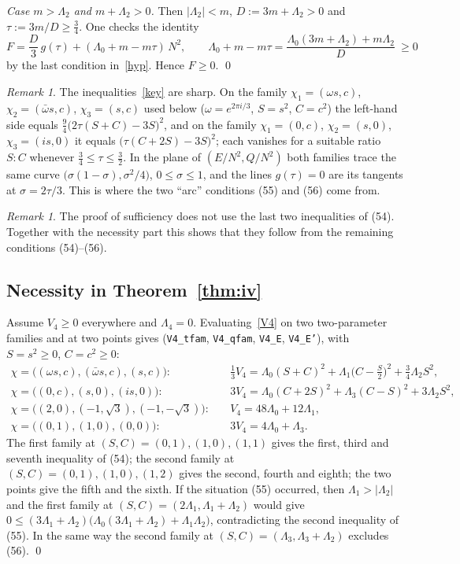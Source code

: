 \documentclass[11pt,a4paper]{amsart}
\theoremstyle{remark}
\newtheorem{remark}[theorem]{Remark}
\newcommand{\La}{\Lambda}
\newcommand{\lean}[1]{\texttt{#1}}
\begin{document}
\emph{Case $m>\La_2$ and $m+\La_2>0$.} Then $|\La_2|<m$, $D:=3m+\La_2>0$ and $\tau:=3m/D\ge\frac34$. One
checks the identity
\[
F=\frac D3\,g(\tau)+(\La_0+m-m\tau)\,N^2,\qquad \La_0+m-m\tau=\frac{\La_0(3m+\La_2)+m\La_2}{D}\ \ge0
\]
by the last condition in~\eqref{hyp}. Hence $F\ge0$. \qed

\begin{remark}
The inequalities~\eqref{key} are sharp. On the family $\chi_1=(\omega s,c)$, $\chi_2=(\bar\omega s,c)$,
$\chi_3=(s,c)$ used below ($\omega=e^{2\pi i/3}$, $S=s^2$, $C=c^2$) the left-hand side equals
$\frac94\bigl(2\tau(S+C)-3S\bigr)^2$, and on the family $\chi_1=(0,c)$, $\chi_2=(s,0)$, $\chi_3=(is,0)$ it equals
$\bigl(\tau(C+2S)-3S\bigr)^2$; each vanishes for a suitable ratio $S:C$ whenever $\frac34\le\tau\le\frac32$.
In the plane of $(E/N^2,Q/N^2)$ both families trace the same curve
$\bigl(\sigma(1-\sigma),\sigma^2/4\bigr)$, $0\le\sigma\le1$, and the lines $g(\tau)=0$ are its tangents at
$\sigma=2\tau/3$. This is where the two ``arc'' conditions (55) and (56) come from.
\end{remark}

\begin{remark}
The proof of sufficiency does not use the last two inequalities of (54). Together with the necessity part this
shows that they follow from the remaining conditions (54)--(56).
\end{remark}

\subsection{Necessity in Theorem~\ref{thm:iv}}
Assume $V_4\ge0$ everywhere and $\La_4=0$. Evaluating~\eqref{V4} on two two-parameter families and at two points
gives (\lean{V4\_tfam}, \lean{V4\_qfam}, \lean{V4\_E}, \lean{V4\_E'}), with $S=s^2\ge0$, $C=c^2\ge0$:
\begin{align*}
\chi=\bigl((\omega s,c),(\bar\omega s,c),(s,c)\bigr):&\quad
\tfrac13V_4=\La_0(S+C)^2+\La_1\bigl(C-\tfrac S2\bigr)^2+\tfrac34\La_2S^2,\\
\chi=\bigl((0,c),(s,0),(is,0)\bigr):&\quad
3V_4=\La_0(C+2S)^2+\La_3(C-S)^2+3\La_2S^2,\\
\chi=\bigl((2,0),(-1,\sqrt3),(-1,-\sqrt3)\bigr):&\quad V_4=48\La_0+12\La_1,\\
\chi=\bigl((0,1),(1,0),(0,0)\bigr):&\quad 3V_4=4\La_0+\La_3 .
\end{align*}
The first family at $(S,C)=(0,1),(1,0),(1,1)$ gives the first, third and seventh inequality of (54); the second
family at $(S,C)=(0,1),(1,0),(1,2)$ gives the second, fourth and eighth; the two points give the fifth and the
sixth. If the situation (55) occurred, then $\La_1>|\La_2|$ and the first family at
$(S,C)=(2\La_1,\La_1+\La_2)$ would give
$0\le(3\La_1+\La_2)\bigl(\La_0(3\La_1+\La_2)+\La_1\La_2\bigr)$, contradicting the second inequality of (55).
In the same way the second family at $(S,C)=(\La_3,\La_3+\La_2)$ excludes (56). \qed
\end{document}
